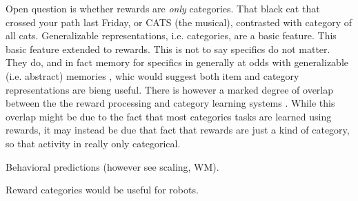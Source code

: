 \documentclass[doc,12pt]{apa}        %
\begin{document}
Open question is whether rewards are \emph{only} categories.  That black cat that crossed your path last Friday, or CATS (the musical), contrasted with category of all cats.  Generalizable representations, i.e. categories, are a basic feature.  This basic feature extended to rewards.  This is not to say specifics do not matter.  They do, and in fact memory for specifics in generally at odds with generalizable (i.e. abstract) memories \cite{Atallah:2004p5466}, whic would suggest both item and category representations are bieng useful.  There is however a marked degree of overlap between the the reward processing and category learning systems \cite{Seger:2010p7189,Ashby:2011p9148}.  While this overlap might be due to the fact that most categories tasks are learned using rewards, it may instead be due that fact that rewards are just a kind of category, so that activity in really only categorical.

Behavioral predictions (however see scaling, WM).

Reward categories would be useful for robots.

\clearpage
\newpage

\end{document}
